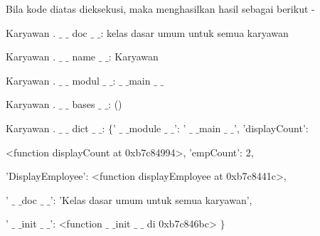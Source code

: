 {Bila kode diatas dieksekusi, maka menghasilkan hasil sebagai berikut - \par
\vspace{12pt}
\noindent 
Karyawan . $  \_  $ $  \_  $ doc $  \_  $ $  \_  $: kelas dasar umum untuk semua karyawan \par
\noindent 
Karyawan . $  \_  $ $  \_  $ name $  \_  $ $  \_  $: Karyawan \par
\noindent 
Karyawan . $  \_  $ $  \_  $ modul $  \_  $ $  \_  $:  $  \_  $ $  \_  $main $  \_  $ $  \_  $ \par
\noindent 
Karyawan . $  \_  $ $  \_  $ bases $  \_  $ $  \_  $: () \par
\noindent 
Karyawan . $  \_  $ $  \_  $ dict $  \_  $ $  \_  $:  $  \{  $' $  \_  $ $  \_  $module $  \_  $ $  \_  $': ' $  \_  $ $  \_  $main $  \_  $ $  \_  $', 'displayCount': \par
\noindent 
<function displayCount at 0xb7c84994>, 'empCount': 2, \par
\noindent 
'DisplayEmployee': <function displayEmployee at 0xb7c8441c>, \par
\noindent 
' $  \_  $ $  \_  $doc $  \_  $ $  \_  $': 'Kelas dasar umum untuk semua karyawan', \par
\noindent 
' $  \_  $ $  \_  $init $  \_  $ $  \_  $': <function  $  \_  $ $  \_  $init $  \_  $ $  \_  $ di 0xb7c846bc> $  \}  $ \par
\vspace{12pt}
\noindent 

}
